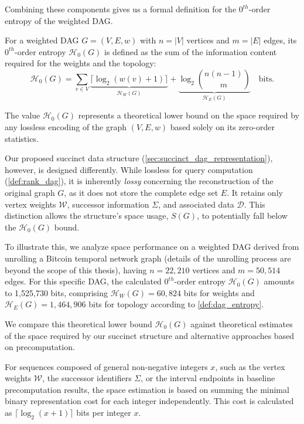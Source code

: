 Combining these components gives us a formal definition for the $0^{th}$-order entropy of the weighted DAG.

\begin{definition}
    \label{def:dag_entropy}
    For a weighted DAG $G = (V, E, w)$ with $n=|V|$ vertices and $m=|E|$ edges, its $0^{th}$-order entropy $\mathcal{H}_0(G)$ is defined as the sum of the information content required for the weights and the topology:
    \[ \mathcal{H}_0(G) = \sum_{v \in V} \underbrace{\lceil \log_2 (w(v)+1) \rceil}_{\mathcal{H}_W(G)} + \underbrace{\log_2 \binom{n(n-1)}{m}}_{\mathcal{H}_E(G)} \quad \text{bits}. \]
\end{definition}

The value $\mathcal{H}_0(G)$ represents a theoretical lower bound on the space required by any lossless encoding of the graph $(V, E, w)$ based solely on its zero-order statistics.

Our proposed succinct data structure (\autoref{sec:succinct_dag_representation}), however, is designed differently. While lossless for \Rank{} query computation (\ref{def:rank_dag}), it is inherently \emph{lossy} concerning the reconstruction of the original graph $G$, as it does not store the complete edge set $E$. It retains only vertex weights $\mathcal{W}$, successor information $\Sigma$, and associated data $\mathcal{D}$. This distinction allows the structure's space usage, $S(G)$, to potentially fall below the $\mathcal{H}_0(G)$ bound.

To illustrate this, we analyze space performance on a weighted DAG derived from unrolling a Bitcoin temporal network graph \cite{kumar2018rev2} (details of the unrolling process are beyond the scope of this thesis), having $n = 22,210$ vertices and $m = 50,514$ edges. For this specific DAG, the calculated $0^{th}$-order entropy $\mathcal{H}_0(G)$ amounts to 1,525,730 bits, comprising $\mathcal{H}_W(G) = 60,824$ bits for weights and $\mathcal{H}_E(G) = 1,464,906$ bits for topology according to \ref{def:dag_entropy}.

We compare this theoretical lower bound $\mathcal{H}_0(G)$ against theoretical estimates of the space required by our succinct structure and alternative approaches based on precomputation.

For sequences composed of general non-negative integers $x$, such as the vertex weights $\mathcal{W}$, the successor identifiers $\Sigma$, or the interval endpoints in baseline precomputation results, the space estimation is based on summing the minimal binary representation cost for each integer independently. This cost is calculated as $\lceil \log_2(x+1) \rceil$ bits per integer $x$.

